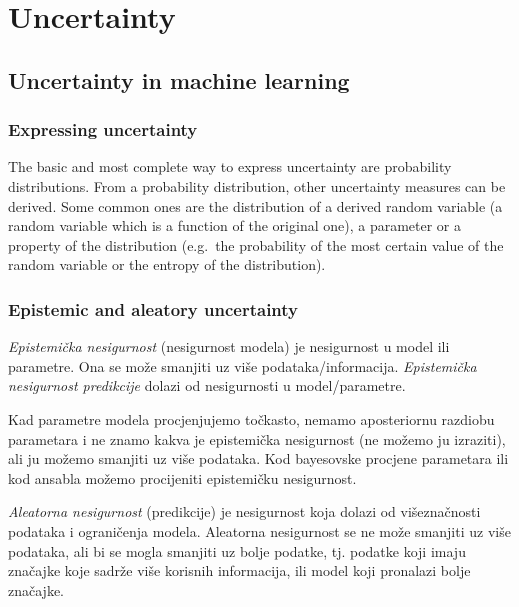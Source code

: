 \documentclass[oneside]{book}
\begin{document}
\chapter{Uncertainty}



\section{Uncertainty in machine learning}


\subsection{Expressing uncertainty}

The basic and most complete way to express uncertainty are probability distributions. From a probability distribution, other uncertainty measures can be derived. Some common ones are the distribution of a derived random variable (a random variable which is a function of the original one), a parameter or a property of the distribution (e.g.\ the probability of the most certain value of the random variable or the entropy of the distribution).


\subsection{Epistemic and aleatory uncertainty}

\emph{Epistemička nesigurnost} (nesigurnost modela) je nesigurnost u model ili parametre. Ona se može smanjiti uz više podataka/informacija. \emph{Epistemička nesigurnost predikcije} dolazi od nesigurnosti u model/parametre.

Kad parametre modela procjenjujemo točkasto, nemamo aposteriornu razdiobu parametara i ne znamo kakva je epistemička nesigurnost (ne možemo ju izraziti), ali ju možemo smanjiti uz više podataka. Kod bayesovske procjene parametara ili kod ansabla možemo procijeniti epistemičku nesigurnost.

\emph{Aleatorna nesigurnost} (predikcije) je nesigurnost koja dolazi od višeznačnosti podataka i ograničenja modela. Aleatorna nesigurnost se ne može smanjiti uz više podataka, ali bi se mogla smanjiti uz bolje podatke, tj. podatke koji imaju značajke koje sadrže više korisnih informacija, ili model koji pronalazi bolje značajke.
\end{document}
